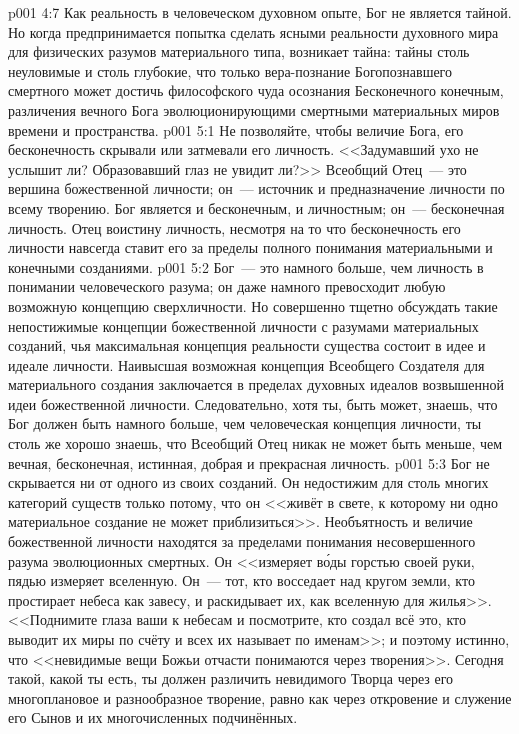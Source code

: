 \vs p001 4:7 Как реальность в человеческом духовном опыте, Бог не является тайной. Но когда предпринимается попытка сделать ясными реальности духовного мира для физических разумов материального типа, возникает тайна: тайны столь неуловимые и столь глубокие, что только вера\hyp{}познание Богопознавшего смертного может достичь философского чуда осознания Бесконечного конечным, различения вечного Бога эволюционирующими смертными материальных миров времени и пространства.
\vs p001 5:1 Не позволяйте, чтобы величие Бога, его бесконечность скрывали или затмевали его личность. <<Задумавший ухо не услышит ли? Образовавший глаз не увидит ли?>> Всеобщий Отец~--- это вершина божественной личности; он~--- источник и предназначение личности по всему творению. Бог является и бесконечным, и личностным; он~--- бесконечная личность. Отец воистину личность, несмотря на то что бесконечность его личности навсегда ставит его за пределы полного понимания материальными и конечными созданиями.
\vs p001 5:2 Бог~--- это намного больше, чем личность в понимании человеческого разума; он даже намного превосходит любую возможную концепцию сверхличности. Но совершенно тщетно обсуждать такие непостижимые концепции божественной личности с разумами материальных созданий, чья максимальная концепция реальности существа состоит в идее и идеале личности. Наивысшая возможная концепция Всеобщего Создателя для материального создания заключается в пределах духовных идеалов возвышенной идеи божественной личности. Следовательно, хотя ты, быть может, знаешь, что Бог должен быть намного больше, чем человеческая концепция личности, ты столь же хорошо знаешь, что Всеобщий Отец никак не может быть меньше, чем вечная, бесконечная, истинная, добрая и прекрасная личность.
\vs p001 5:3 Бог не скрывается ни от одного из своих созданий. Он недостижим для столь многих категорий существ только потому, что он <<живёт в свете, к которому ни одно материальное создание не может приблизиться>>. Необъятность и величие божественной личности находятся за пределами понимания несовершенного разума эволюционных смертных. Он <<измеряет в\'оды горстью своей руки, пядью измеряет вселенную. Он~--- тот, кто восседает над кругом земли, кто простирает небеса как завесу, и раскидывает их, как вселенную для жилья>>. <<Поднимите глаза ваши к небесам и посмотрите, кто создал всё это, кто выводит их миры по счёту и всех их называет по именам>>; и поэтому истинно, что <<невидимые вещи Божьи отчасти понимаются через творения>>. Сегодня такой, какой ты есть, ты должен различить невидимого Творца через его многоплановое и разнообразное творение, равно как через откровение и служение его Сынов и их многочисленных подчинённых.
